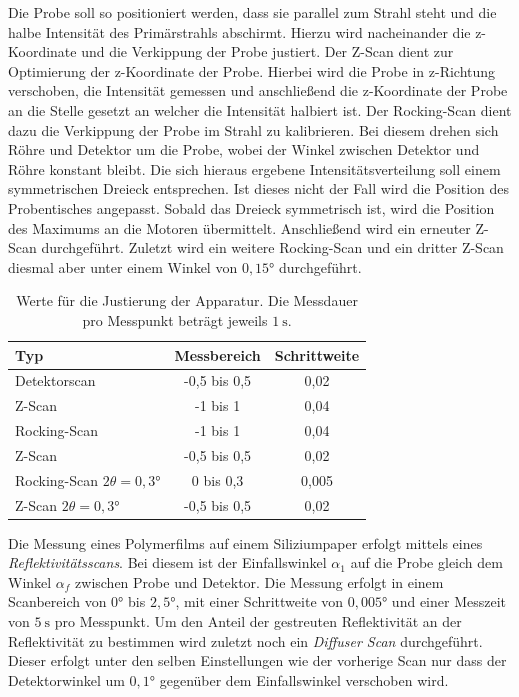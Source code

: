 Die Probe soll so positioniert werden, dass sie parallel zum Strahl steht und die halbe Intensität des Primärstrahls abschirmt.
Hierzu wird nacheinander die z-Koordinate und die Verkippung der Probe justiert.
Der Z-Scan dient zur Optimierung der z-Koordinate der Probe.
Hierbei wird die Probe in z-Richtung verschoben, die Intensität gemessen und anschließend die z-Koordinate der Probe an die Stelle gesetzt an welcher die Intensität halbiert ist.
Der Rocking-Scan dient dazu die Verkippung der Probe im Strahl zu kalibrieren.
Bei diesem drehen sich Röhre und Detektor um die Probe, wobei der Winkel zwischen Detektor und Röhre konstant bleibt.
Die sich hieraus ergebene Intensitätsverteilung soll einem symmetrischen Dreieck entsprechen.
Ist dieses nicht der Fall wird die Position des Probentisches angepasst.
Sobald das Dreieck symmetrisch ist, wird die Position des Maximums an die Motoren übermittelt.
Anschließend wird ein erneuter Z-Scan durchgeführt.
Zuletzt wird ein weitere Rocking-Scan und ein dritter Z-Scan diesmal aber unter einem Winkel von $0,15°$ durchgeführt.
\begin{table}[H]
    \centering
    \caption{Werte für die Justierung der Apparatur. Die Messdauer pro Messpunkt beträgt jeweils $\SI{1}{\s}$.}
    \label{tab:ttab1}
    \begin{tabular}{l c c }
        \toprule
        {Typ} & {Messbereich} & {Schrittweite}\\
        \midrule
        Detektorscan                    & -0,5 bis 0,5   & 0,02 \\
        Z-Scan                          & -1 bis 1       & 0,04 \\
        Rocking-Scan                    & -1 bis 1       & 0,04 \\
        Z-Scan                          & -0,5 bis 0,5   & 0,02 \\
        Rocking-Scan $2\theta = 0,3°$   & 0 bis 0,3      & 0,005\\
        Z-Scan $2\theta = 0,3°$         & -0,5 bis 0,5   & 0,02 \\
        \bottomrule
    \end{tabular}
\end{table}

Die Messung eines Polymerfilms auf einem Siliziumpaper erfolgt mittels eines \textit{Reflektivitätsscans}.
Bei diesem ist der Einfallswinkel $\alpha_1$ auf die Probe gleich dem Winkel $\alpha_f$ zwischen Probe und Detektor.
Die Messung erfolgt in einem Scanbereich von $0°$ bis $2,5°$, mit einer Schrittweite von $0,005°$ und einer Messzeit von $\SI{5}{\s}$ pro Messpunkt.
Um den Anteil der gestreuten Reflektivität an der Reflektivität zu bestimmen wird zuletzt noch ein \textit{Diffuser Scan} durchgeführt.
Dieser erfolgt unter den selben Einstellungen wie der vorherige Scan nur dass der Detektorwinkel um $0,1°$ gegenüber dem Einfallswinkel verschoben wird.
